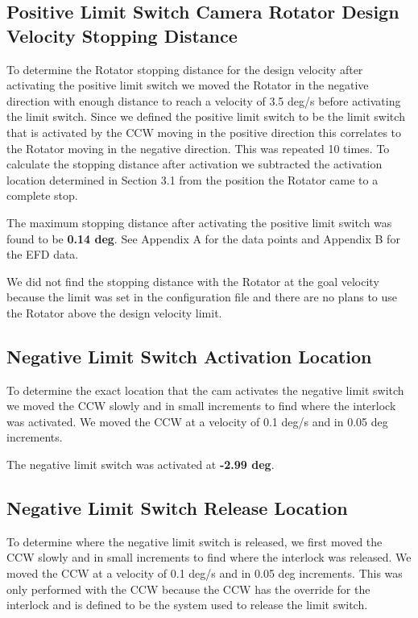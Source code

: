 \documentclass[SE,lsstdraft,authoryear,toc]{lsstdoc}
\begin{document}
\subsection{Positive Limit Switch Camera Rotator Design Velocity Stopping Distance}

To determine the Rotator stopping distance for the design velocity after
activating the positive limit switch we moved the Rotator in the
negative direction with enough distance to reach a velocity of 3.5 deg/s
before activating the limit switch. Since we defined the positive limit
switch to be the limit switch that is activated by the CCW moving in the
positive direction this correlates to the Rotator moving in the negative
direction. This was repeated 10 times. To calculate the stopping
distance after activation we subtracted the activation location
determined in Section 3.1 from the position the Rotator came to a
complete stop.

The maximum stopping distance after activating the positive limit switch
was found to be \textbf{0.14 deg}. See Appendix A for the data points
and Appendix B for the EFD data.

We did not find the stopping distance with the Rotator at the goal
velocity because the limit was set in the configuration file and there
are no plans to use the Rotator above the design velocity limit.

\subsection{Negative Limit Switch Activation Location}

To determine the exact location that the cam activates the negative
limit switch we moved the CCW slowly and in small increments to find
where the interlock was activated. We moved the CCW at a velocity of 0.1
deg/s and in 0.05 deg increments.

The negative limit switch was activated at \textbf{-2.99 deg}.

\subsection{Negative Limit Switch Release Location}

To determine where the negative limit switch is released, we first moved
the CCW slowly and in small increments to find where the interlock was
released. We moved the CCW at a velocity of 0.1 deg/s and in 0.05 deg
increments. This was only performed with the CCW because the CCW has the
override for the interlock and is defined to be the system used to
release the limit switch.
\end{document}
